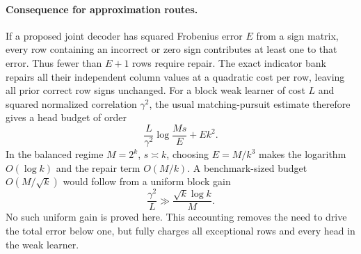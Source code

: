 \documentclass{article}
\begin{document}
\paragraph{Consequence for approximation routes.}
If a proposed joint decoder has squared Frobenius error $E$ from a sign
matrix, every row containing an incorrect or zero sign contributes at
least one to that error. Thus fewer than $E+1$ rows require repair. The
exact indicator bank repairs all their independent column values at a
quadratic cost per row, leaving all prior correct row signs unchanged.
For a block weak learner of cost $L$ and squared normalized correlation
$\gamma^2$, the usual matching-pursuit estimate therefore gives a
head budget of order
\[
 \frac{L}{\gamma^2}\log\frac{Ms}{E}+E k^2.
\]
In the balanced regime $M=2^k$, $s\asymp k$, choosing
$E=M/k^3$ makes the logarithm $O(\log k)$ and the repair term $O(M/k)$.
A benchmark-sized budget $O(M/\sqrt{k})$ would follow from a uniform
block gain
\[
 \frac{\gamma^2}{L}\gg\frac{\sqrt{k}\log k}{M}.
\]
No such uniform gain is proved here. This accounting removes the need
to drive the total error below one, but fully charges all exceptional
rows and every head in the weak learner.
\end{document}
